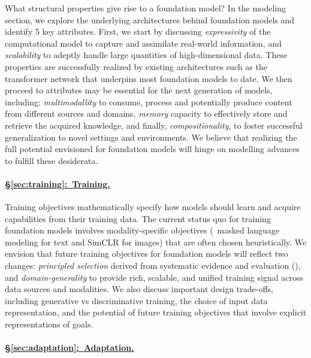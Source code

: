 What structural properties give rise to a foundation model? In the modeling section, we explore the underlying architectures behind foundation models and identify 5 key attributes. First, we start by discussing \textit{expressivity} of the computational model \dash{} to capture and assimilate real-world information, and \textit{scalability} \dash{} to adeptly handle large quantities of high-dimensional data. These properties are successfully realized by existing architectures such as the transformer network \citep{vaswani2017attention} that underpins most foundation models to date. We then proceed to attributes may be essential for the next generation of models, including: \textit{multimodallity} \dash{} to consume, process and potentially produce content from different sources and domains, \textit{memory} capacity \dash{} to effectively store and retrieve the acquired knowledge, and finally, \textit{compositionality}, to foster successful generalization to novel settings and environments. We believe that realizing the full potential envisioned for foundation models will hinge on modelling advances to fulfill these desiderata.

\paragraph{\hyperref[sec:training]{§\ref{sec:training}:~Training.}}

Training objectives mathematically specify how models should learn and acquire capabilities from their training data.
The current status quo for training foundation models involves modality-specific objectives (\eg~masked language modeling \citep{devlin2019bert} for text and SimCLR \citep{chen2020simclr} for images) that are often chosen heuristically.
We envision that future training objectives for foundation models will reflect two changes: \textit{principled selection} derived from systematic evidence and evaluation (), and \textit{domain-generality} to provide rich, scalable, and unified training signal across data sources and modalities. We also discuss important design trade-offs, including generative vs discriminative training, the choice of input data representation, and the potential of future training objectives that involve explicit representations of goals.

\paragraph{\hyperref[sec:adaptation]{§\ref{sec:adaptation}:~Adaptation.}}

